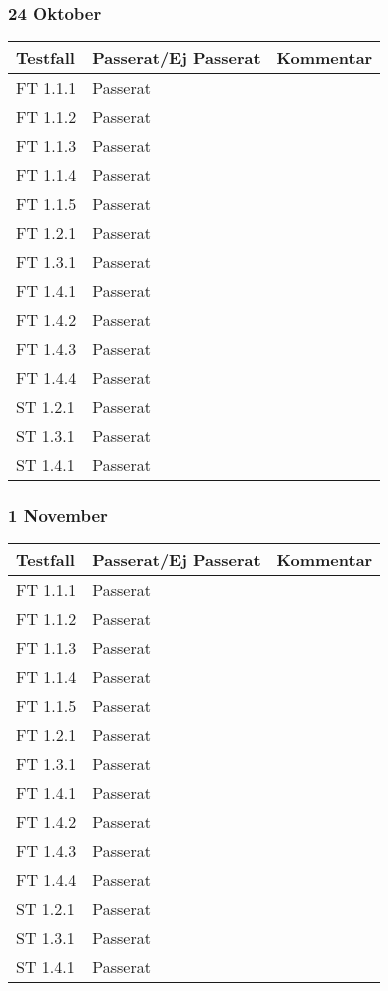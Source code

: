\documentclass[a4paper]{article}
\begin{document}
\subsubsection{24 Oktober}
\begin{tabular}{| l | l | p{9cm} |}
\hline
Testfall & Passerat/Ej Passerat & Kommentar\\
\hline
FT 1.1.1 & Passerat & \\
\hline
FT 1.1.2 & Passerat & \\
\hline
FT 1.1.3 & Passerat & \\
\hline
FT 1.1.4 & Passerat & \\
\hline
FT 1.1.5 & Passerat & \\
\hline
FT 1.2.1 & Passerat & \\
\hline
FT 1.3.1 & Passerat & \\
\hline
FT 1.4.1 & Passerat & \\
\hline
FT 1.4.2 & Passerat & \\
\hline
FT 1.4.3 & Passerat & \\
\hline
FT 1.4.4 & Passerat & \\
\hline
ST 1.2.1 & Passerat & \\
\hline
ST 1.3.1 & Passerat & \\
\hline
ST 1.4.1 & Passerat & \\
\hline
\end{tabular}

\subsubsection{1 November}
\begin{tabular}{| l | l | p{9cm} |}
\hline
Testfall & Passerat/Ej Passerat & Kommentar\\
\hline
FT 1.1.1 & Passerat & \\
\hline
FT 1.1.2 & Passerat & \\
\hline
FT 1.1.3 & Passerat & \\
\hline
FT 1.1.4 & Passerat & \\
\hline
FT 1.1.5 & Passerat & \\
\hline
FT 1.2.1 & Passerat & \\
\hline
FT 1.3.1 & Passerat & \\
\hline
FT 1.4.1 & Passerat & \\
\hline
FT 1.4.2 & Passerat & \\
\hline
FT 1.4.3 & Passerat & \\
\hline
FT 1.4.4 & Passerat & \\
\hline
ST 1.2.1 & Passerat & \\
\hline
ST 1.3.1 & Passerat & \\
\hline
ST 1.4.1 & Passerat & \\
\hline
\end{tabular}
\end{document}
